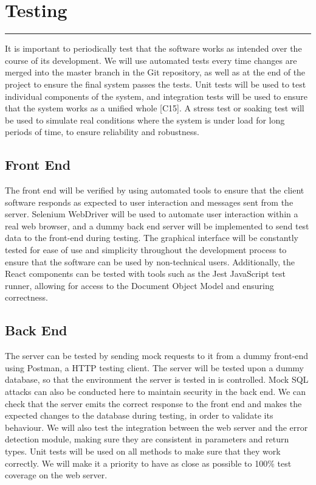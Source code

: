 \documentclass{article}
\begin{document}
\section*{Testing}
\hrule
\vspace{9pt}
It is important to periodically test that the software works as intended over the course of its development.  We will use automated tests every time changes are merged into the master branch in the Git repository, as well as at the end of the project to ensure the final system passes the tests.  Unit tests will be used to test individual components of the system, and integration tests will be used to ensure that the system works as a unified whole [C15]. A stress test or soaking test will be used to simulate real conditions where the system
is under load for long periods of time, to ensure reliability and robustness.

\subsection*{Front End}
The front end will be verified by using automated tools to ensure that the client software responds as expected to user interaction and messages sent from the server. Selenium WebDriver will be used to automate user interaction within a real web browser, and a dummy back end server will be implemented to send test data to the front-end during testing. The graphical interface will be constantly tested for ease of use and simplicity throughout the development process to ensure that the software can be used by non-technical users. Additionally, the React components can be tested with tools such as the Jest JavaScript test runner, allowing for access to the Document Object Model and ensuring correctness.

\subsection*{Back End}
The server can be tested by sending mock requests to it from a dummy front-end using Postman, a HTTP testing client.  The server will be tested upon a dummy database, so that the environment the server is tested in is controlled. Mock SQL attacks can also be conducted here to maintain security in the back end.  We can check that the server emits the correct response to the front end and makes the expected changes to the database during testing, in order to validate its behaviour. We will also test the integration between the web server and the error detection module, making sure they are consistent in parameters and return types. Unit tests will be used on all methods to make sure that they work correctly. We will make it a priority to have as close as possible to 100\% test coverage on the web server.  
\end{document}
